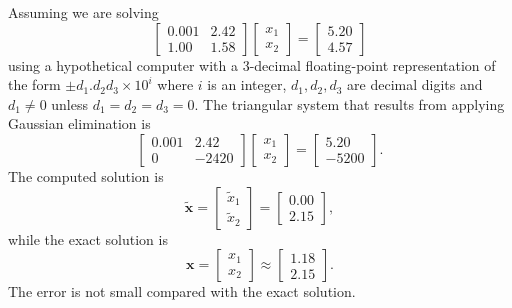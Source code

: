 \begin{exm}
    \label{exm::instable}
    Assuming we are solving
    $$
        \begin{bmatrix}
            0.001&2.42\\1.00&1.58
        \end{bmatrix}
        \begin{bmatrix}
            x_1\\x_2
        \end{bmatrix}=
        \begin{bmatrix}
            5.20\\4.57
        \end{bmatrix}
    $$ 
    using a hypothetical computer with a 3-decimal 
    floating-point representation of the form 
    $\pm d_1.d_2d_3\times 10^i$ where $i$ is an integer, 
    $d_1,d_2,d_3$ are decimal digits and $d_1\neq 0$ unless 
    $d_1=d_2=d_3=0$. The triangular system that results from 
    applying Gaussian elimination is
    $$
        \begin{bmatrix}
            0.001&2.42\\0&-2420
        \end{bmatrix}
        \begin{bmatrix}
            x_1\\x_2
        \end{bmatrix}=
        \begin{bmatrix}
            5.20\\-5200
        \end{bmatrix}.
    $$ 
    The computed solution is 
    $$
        \tilde{\mathbf{x}}=\begin{bmatrix}
            \tilde{x}_1\\\tilde{x}_2
        \end{bmatrix}=
        \begin{bmatrix}
            0.00\\2.15
        \end{bmatrix},
    $$
    while the exact solution is
    $$
        \mathbf{x}=\begin{bmatrix}
            x_1\\x_2
        \end{bmatrix}\approx
        \begin{bmatrix}
            1.18\\2.15
        \end{bmatrix}.
    $$
    The error is not small compared with the exact solution.


\end{exm}
